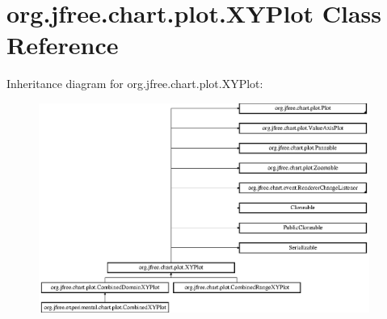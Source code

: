 \hypertarget{classorg_1_1jfree_1_1chart_1_1plot_1_1_x_y_plot}{}\section{org.\+jfree.\+chart.\+plot.\+X\+Y\+Plot Class Reference}
\label{classorg_1_1jfree_1_1chart_1_1plot_1_1_x_y_plot}
Inheritance diagram for org.\+jfree.\+chart.\+plot.\+X\+Y\+Plot\+:\begin{figure}[H]
\begin{center}
\leavevmode
\includegraphics[height=6.844445cm]{classorg_1_1jfree_1_1chart_1_1plot_1_1_x_y_plot}
\end{center}
\end{figure}
